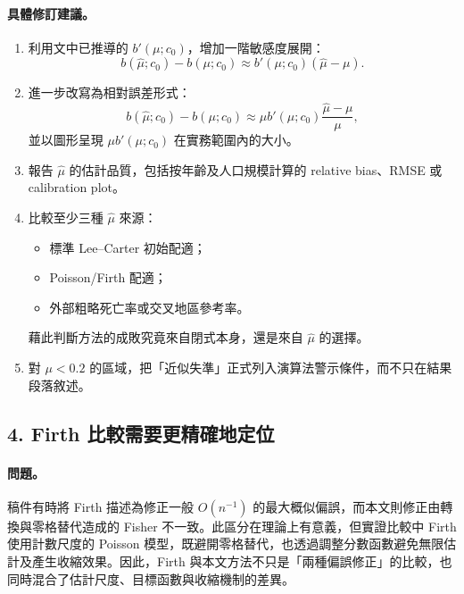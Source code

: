 \documentclass[12pt,a4paper]{article}
\begin{document}
\paragraph{具體修訂建議。}
\begin{enumerate}
  \item 利用文中已推導的 $b'(\mu;c_0)$，增加一階敏感度展開：
  \[
  b(\widehat\mu;c_0)-b(\mu;c_0)
  \approx b'(\mu;c_0)(\widehat\mu-\mu).
  \]
  \item 進一步改寫為相對誤差形式：
  \[
  b(\widehat\mu;c_0)-b(\mu;c_0)
  \approx \mu b'(\mu;c_0)
  \frac{\widehat\mu-\mu}{\mu},
  \]
  並以圖形呈現 $\mu b'(\mu;c_0)$ 在實務範圍內的大小。
  \item 報告 $\widehat\mu$ 的估計品質，包括按年齡及人口規模計算的 relative bias、RMSE 或 calibration plot。
  \item 比較至少三種 $\widehat\mu$ 來源：
  \begin{itemize}
    \item 標準 Lee--Carter 初始配適；
    \item Poisson/Firth 配適；
    \item 外部粗略死亡率或交叉地區參考率。
  \end{itemize}
  藉此判斷方法的成敗究竟來自閉式本身，還是來自 $\widehat\mu$ 的選擇。
  \item 對 $\mu<0.2$ 的區域，把「近似失準」正式列入演算法警示條件，而不只在結果段落敘述。
\end{enumerate}

\subsection*{4. Firth 比較需要更精確地定位}

\paragraph{問題。}
稿件有時將 Firth 描述為修正一般 $O(n^{-1})$ 的最大概似偏誤，而本文則修正由轉換與零格替代造成的 Fisher 不一致。此區分在理論上有意義，但實證比較中 Firth 使用計數尺度的 Poisson 模型，既避開零格替代，也透過調整分數函數避免無限估計及產生收縮效果。因此，Firth 與本文方法不只是「兩種偏誤修正」的比較，也同時混合了估計尺度、目標函數與收縮機制的差異。
\end{document}

